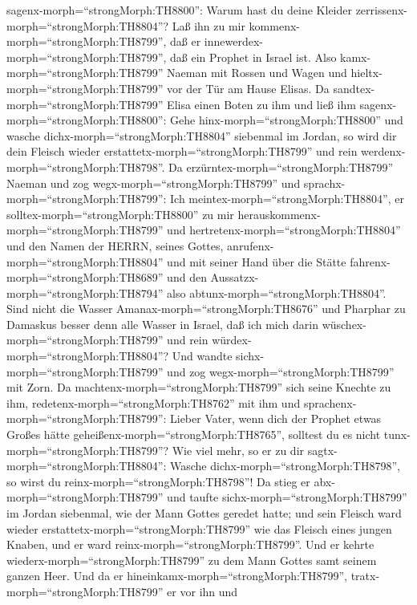 sagenx-morph=``strongMorph:TH8800'': Warum hast du deine Kleider
zerrissenx-morph=``strongMorph:TH8804''? Laß ihn zu mir
kommenx-morph=``strongMorph:TH8799'', daß er
innewerdex-morph=``strongMorph:TH8799'', daß ein Prophet in Israel ist.
 Also kamx-morph=``strongMorph:TH8799'' Naeman mit Rossen
und Wagen und hieltx-morph=``strongMorph:TH8799'' vor der Tür am Hause
Elisas.  Da sandtex-morph=``strongMorph:TH8799'' Elisa
einen Boten zu ihm und ließ ihm sagenx-morph=``strongMorph:TH8800'':
Gehe hinx-morph=``strongMorph:TH8800'' und wasche
dichx-morph=``strongMorph:TH8804'' siebenmal im Jordan, so wird dir dein
Fleisch wieder erstattetx-morph=``strongMorph:TH8799'' und rein
werdenx-morph=``strongMorph:TH8798''.  Da
erzürntex-morph=``strongMorph:TH8799'' Naeman und zog
wegx-morph=``strongMorph:TH8799'' und
sprachx-morph=``strongMorph:TH8799'': Ich
meintex-morph=``strongMorph:TH8804'', er
solltex-morph=``strongMorph:TH8800'' zu mir
herauskommenx-morph=``strongMorph:TH8799'' und
hertretenx-morph=``strongMorph:TH8804'' und den Namen der HERRN, seines
Gottes, anrufenx-morph=``strongMorph:TH8804'' und mit seiner Hand über
die Stätte fahrenx-morph=``strongMorph:TH8689'' und den
Aussatzx-morph=``strongMorph:TH8794'' also
abtunx-morph=``strongMorph:TH8804''.  Sind nicht die Wasser
Amanax-morph=``strongMorph:TH8676'' und Pharphar zu Damaskus besser denn
alle Wasser in Israel, daß ich mich darin
wüschex-morph=``strongMorph:TH8799'' und rein
würdex-morph=``strongMorph:TH8804''? Und wandte
sichx-morph=``strongMorph:TH8799'' und zog
wegx-morph=``strongMorph:TH8799'' mit Zorn.  Da
machtenx-morph=``strongMorph:TH8799'' sich seine Knechte zu ihm,
redetenx-morph=``strongMorph:TH8762'' mit ihm und
sprachenx-morph=``strongMorph:TH8799'': Lieber Vater, wenn dich der
Prophet etwas Großes hätte geheißenx-morph=``strongMorph:TH8765'',
solltest du es nicht tunx-morph=``strongMorph:TH8799''? Wie viel mehr,
so er zu dir sagtx-morph=``strongMorph:TH8804'': Wasche
dichx-morph=``strongMorph:TH8798'', so wirst du
reinx-morph=``strongMorph:TH8798''!  Da stieg er
abx-morph=``strongMorph:TH8799'' und taufte
sichx-morph=``strongMorph:TH8799'' im Jordan siebenmal, wie der Mann
Gottes geredet hatte; und sein Fleisch ward wieder
erstattetx-morph=``strongMorph:TH8799'' wie das Fleisch eines jungen
Knaben, und er ward reinx-morph=``strongMorph:TH8799''. 
Und er kehrte wiederx-morph=``strongMorph:TH8799'' zu dem Mann Gottes
samt seinem ganzen Heer. Und da er
hineinkamx-morph=``strongMorph:TH8799'',
tratx-morph=``strongMorph:TH8799'' er vor ihn und
